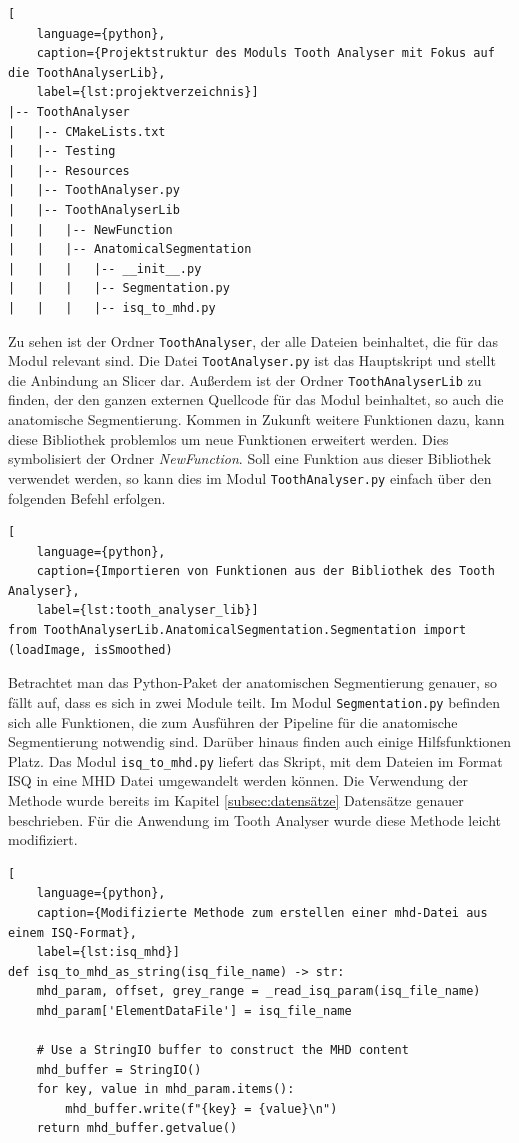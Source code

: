 \begin{lstlisting}[
    language={python},
    caption={Projektstruktur des Moduls Tooth Analyser mit Fokus auf die ToothAnalyserLib},
    label={lst:projektverzeichnis}]
|-- ToothAnalyser
|   |-- CMakeLists.txt
|   |-- Testing
|   |-- Resources
|   |-- ToothAnalyser.py
|   |-- ToothAnalyserLib
|   |   |-- NewFunction
|   |   |-- AnatomicalSegmentation
|   |   |   |-- __init__.py
|   |   |   |-- Segmentation.py
|   |   |   |-- isq_to_mhd.py
\end{lstlisting}

Zu sehen ist der Ordner \texttt{ToothAnalyser}, der alle Dateien beinhaltet, die
für das Modul relevant sind. Die Datei \texttt{TootAnalyser.py} ist das Hauptskript
und stellt die Anbindung an Slicer dar. Außerdem ist der Ordner \texttt{ToothAnalyserLib}
zu finden, der den ganzen externen Quellcode für das Modul beinhaltet, so auch die
anatomische Segmentierung. Kommen in Zukunft weitere Funktionen dazu, kann diese
Bibliothek problemlos um neue Funktionen erweitert werden. Dies symbolisiert der
Ordner \textsl{NewFunction}. Soll eine Funktion aus dieser Bibliothek verwendet
werden, so kann dies im Modul \texttt{ToothAnalyser.py} einfach über den
folgenden Befehl erfolgen.

\begin{lstlisting}[
    language={python},
    caption={Importieren von Funktionen aus der Bibliothek des Tooth Analyser},
    label={lst:tooth_analyser_lib}]
from ToothAnalyserLib.AnatomicalSegmentation.Segmentation import (loadImage, isSmoothed)
\end{lstlisting}

Betrachtet man das Python-Paket der anatomischen Segmentierung genauer, so fällt
auf, dass es sich in zwei Module teilt. Im Modul \texttt{Segmentation.py} befinden
sich alle Funktionen, die zum Ausführen der Pipeline für die anatomische
Segmentierung notwendig sind. Darüber hinaus finden auch einige Hilfsfunktionen Platz.
Das Modul \texttt{isq\_to\_mhd.py} liefert das Skript, mit dem Dateien im Format
\ac{ISQ} in eine \ac{MHD} Datei umgewandelt werden können. Die Verwendung der Methode
wurde bereits im Kapitel \ref{subsec:datensätze} Datensätze genauer beschrieben.
Für die Anwendung im Tooth Analyser wurde diese Methode leicht modifiziert.

\begin{lstlisting}[
    language={python},
    caption={Modifizierte Methode zum erstellen einer mhd-Datei aus einem ISQ-Format},
    label={lst:isq_mhd}]
def isq_to_mhd_as_string(isq_file_name) -> str:
    mhd_param, offset, grey_range = _read_isq_param(isq_file_name)
    mhd_param['ElementDataFile'] = isq_file_name

    # Use a StringIO buffer to construct the MHD content
    mhd_buffer = StringIO()
    for key, value in mhd_param.items():
        mhd_buffer.write(f"{key} = {value}\n")
    return mhd_buffer.getvalue()
\end{lstlisting}

